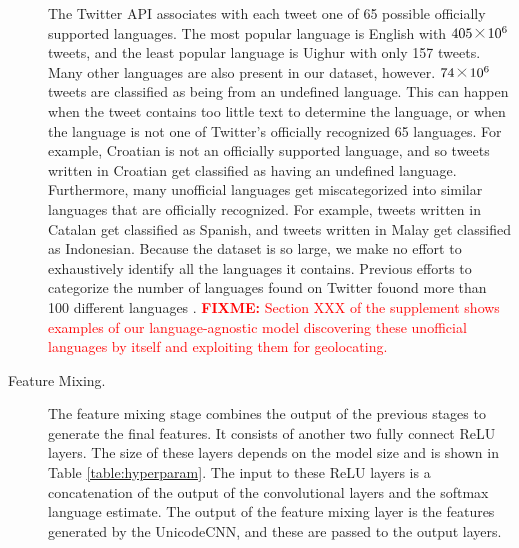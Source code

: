 \documentclass[sigconf,anonymous,review]{acmart}
\renewcommand{\times}{\mathbin{\tikz [x=1.4ex,y=1.4ex,line width=.1ex] \draw (0,0) -- (1,1) (0,1) -- (1,0);}}%
\newcommand{\fixme}[1]{\textcolor{red}{\textbf{FIXME:} {#1}}}
\begin{document}
\begin{description}
{%
The Twitter API associates with each tweet one of 65 possible officially supported languages.
The most popular language is English with $405\times10^6$ tweets,
and the least popular language is Uighur with only 157 tweets.
Many other languages are also present in our dataset, however.
$74\times10^6$ tweets are classified as being from an undefined language.
This can happen when the tweet contains too little text to determine the language,
or when the language is not one of Twitter's officially recognized 65 languages.
For example, Croatian is not an officially supported language,
and so tweets written in Croatian get classified as having an undefined language.
Furthermore, many unofficial languages get miscategorized into similar languages that are officially recognized.
For example, 
tweets written in Catalan get classified as Spanish,
and tweets written in Malay get classified as Indonesian.
Because the dataset is so large,
we make no effort to exhaustively identify all the languages it contains.
Previous efforts to categorize the number of languages found on Twitter fouond more than 100 different languages \citep{hong2011language}.
\fixme{Section XXX of the supplement shows examples of our language-agnostic model discovering these unofficial languages by itself and exploiting them for geolocating.}
}


\item[Feature Mixing.]
The feature mixing stage combines the output of the previous stages to generate the final features.
It consists of another two fully connect ReLU layers.
The size of these layers depends on the model size and is shown in Table \ref{table:hyperparam}.
The input to these ReLU layers is a concatenation of the output of the convolutional layers and the softmax language estimate.
The output of the feature mixing layer is the features generated by the UnicodeCNN,
and these are passed to the output layers.


\end{description}
\end{document}
